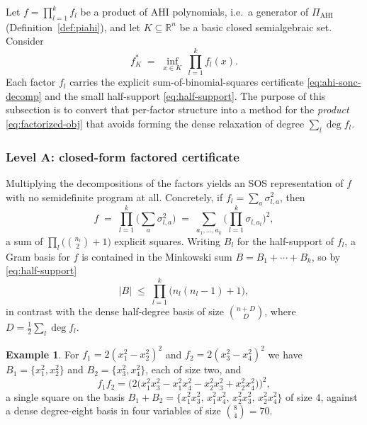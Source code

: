 \documentclass[12pt]{elsarticle}
\theoremstyle{definition}
\newtheorem{example}[theorem]{Example}
\newcommand{\AHI}{\mathrm{AHI}}
\newcommand{\PiAHI}{\Pi_{\AHI}}
\begin{document}
Let $f = \prod_{l=1}^{k} f_l$ be a product of AHI polynomials, i.e.\ a generator of $\PiAHI$ (Definition~\ref{def:piahi}), and let $K \subseteq \mathbb{R}^{n}$ be a basic closed semialgebraic set. Consider
\begin{equation}\label{eq:factorized-obj}
f^{*}_{K} \;=\; \inf_{x \in K}\ \prod_{l=1}^{k} f_l(x).
\end{equation}
Each factor $f_l$ carries the explicit sum-of-binomial-squares certificate \eqref{eq:ahi-sonc-decomp} and the small half-support \eqref{eq:half-support}. The purpose of this subsection is to convert that per-factor structure into a method for the \emph{product} \eqref{eq:factorized-obj} that avoids forming the dense relaxation of degree $\sum_l \deg f_l$.

\subsubsection{Level A: closed-form factored certificate}\label{subsubsec:levelA}

Multiplying the decompositions of the factors yields an SOS representation of $f$ with no semidefinite program at all. Concretely, if $f_l=\sum_{a}\sigma_{l,a}^2$, then
\begin{equation}\label{eq:product-of-squares}
f \;=\; \prod_{l=1}^k \Big(\sum_a \sigma_{l,a}^2\Big) \;=\; \sum_{a_1,\dots,a_k}\Big(\prod_{l=1}^k \sigma_{l,a_l}\Big)^{2},
\end{equation}
a sum of $\prod_l\big(\binom{n_l}{2}+1\big)$ explicit squares. Writing $B_l$ for the half-support of $f_l$, a Gram basis for $f$ is contained in the Minkowski sum $B = B_1 + \cdots + B_k$, so by \eqref{eq:half-support}
\begin{equation}\label{eq:basis-size}
|B| \;\le\; \prod_{l=1}^{k}\big(n_l(n_l-1)+1\big),
\end{equation}
in contrast with the dense half-degree basis of size $\binom{n+D}{D}$, where $D = \tfrac12\sum_l \deg f_l$.

\begin{example}\label{ex:levelA}
For $f_1 = 2(x_1^2-x_2^2)^2$ and $f_2 = 2(x_3^2-x_4^2)^2$ we have $B_1=\{x_1^2,x_2^2\}$ and $B_2=\{x_3^2,x_4^2\}$, each of size two, and
\[
f_1f_2 = \Big(2\big(x_1^2x_3^2 - x_1^2x_4^2 - x_2^2x_3^2 + x_2^2x_4^2\big)\Big)^{2},
\]
a single square on the basis $B_1+B_2=\{x_1^2x_3^2,\,x_1^2x_4^2,\,x_2^2x_3^2,\,x_2^2x_4^2\}$ of size $4$, against a dense degree-eight basis in four variables of size $\binom{8}{4}=70$.
\end{example}
\end{document}
